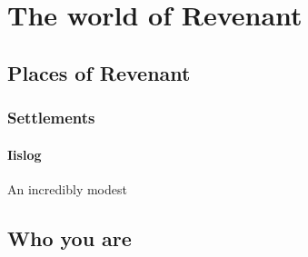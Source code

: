 \documentclass{report}
\begin{document}
\chapter*{The world of Revenant}

\section*{Places of Revenant}
\subsection*{Settlements}
\subsubsection*{Iislog}
An incredibly modest 
\section*{Who you are}
\end{document}
